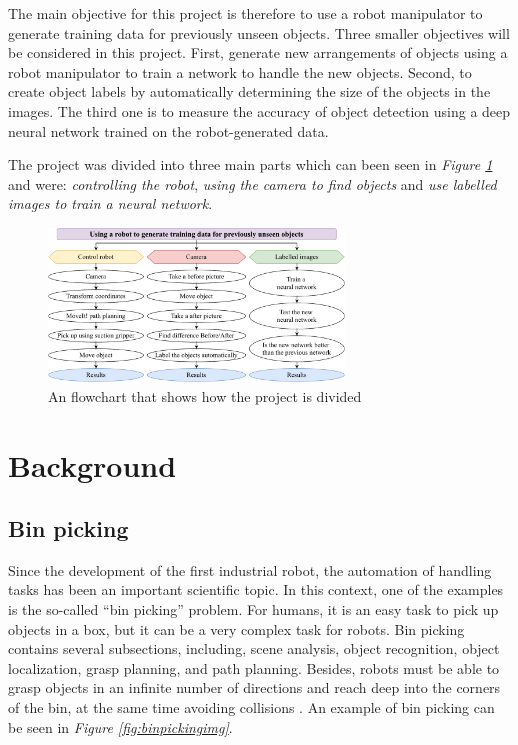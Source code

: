 The main objective for this project is therefore to use a robot manipulator to generate training data for previously unseen objects. 
Three smaller objectives will be considered in this project. 
First, generate new arrangements of objects using a robot manipulator to train a network to handle the new objects. 
Second, to create object labels by automatically determining the size of the objects in the images.
The third one is to measure the accuracy of object detection using a deep neural network trained on the robot-generated data.

The project was divided into three main parts which can been seen in \textit{Figure \ref{fig:project}} and were: \textit{controlling the robot}, \textit{using the camera to find objects} and \textit{use labelled images to train a neural network}. 
\begin{figure}[h]
 \centering
 \includegraphics[width=0.7\textwidth]{graphics/meis.pdf}
 \caption{An flowchart that shows how the project is divided}
 \label{fig:project}
\end{figure}


\section{Background}

\subsection{Bin picking}\label{sec:binpicking}
Since the development of the first industrial robot, the automation of handling tasks has been an important scientific topic. In this context, one of the examples is the so-called “bin picking” problem\cite{buchholz_bin-picking_2016}. 
For humans, it is an easy task to pick up objects in a box, but it can be a very complex task for robots. 
Bin picking contains several subsections, including, scene analysis, object recognition, object localization, grasp planning, and path planning. 
Besides, robots must be able to grasp objects in an infinite number of directions and reach deep into the corners of the bin, at the same time avoiding collisions \cite{truebenbach_is_2019}. An example of bin picking can be seen in \textit{Figure \ref{fig:binpickingimg}}.

